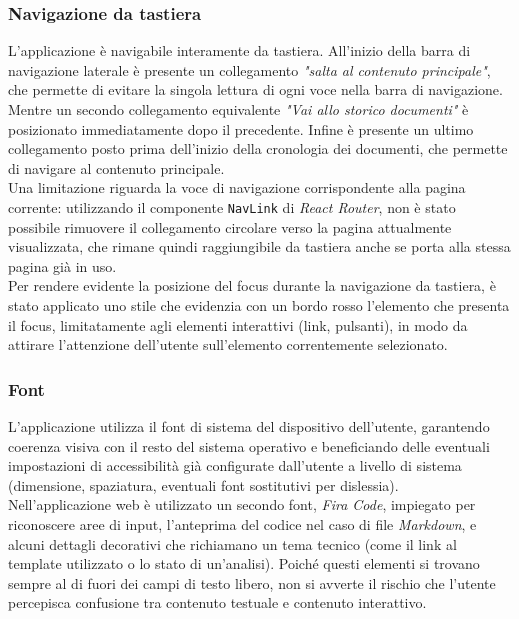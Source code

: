 \subsubsection{Navigazione da tastiera}
L'applicazione è navigabile interamente da tastiera. All'inizio della barra di navigazione laterale è presente un collegamento \emph{"salta al contenuto principale"}, che permette di evitare la singola lettura di ogni voce nella barra di navigazione. Mentre un secondo collegamento equivalente \emph{"Vai allo storico documenti"} è posizionato immediatamente dopo il precedente. Infine è presente un ultimo collegamento posto prima dell'inizio della cronologia dei documenti, che permette di navigare al contenuto principale.\\

Una limitazione riguarda la voce di navigazione corrispondente alla pagina corrente: utilizzando il componente \texttt{NavLink} di \emph{React Router}, non è stato possibile rimuovere il collegamento circolare verso la pagina attualmente visualizzata, che rimane quindi raggiungibile da tastiera anche se porta alla stessa pagina già in uso.\\

Per rendere evidente la posizione del focus durante la navigazione da tastiera, è stato applicato uno stile che evidenzia con un bordo rosso l'elemento che presenta il focus, limitatamente agli elementi interattivi (link, pulsanti), in modo da attirare l'attenzione dell'utente sull'elemento correntemente selezionato.

\subsubsection{Font}
L'applicazione utilizza il font di sistema del dispositivo dell'utente, garantendo coerenza visiva con il resto del sistema operativo e beneficiando delle eventuali impostazioni di accessibilità già configurate dall'utente a livello di sistema (dimensione, spaziatura, eventuali font sostitutivi per dislessia).\\

Nell'applicazione web è utilizzato un secondo font, \emph{Fira Code}, impiegato per riconoscere aree di input, l'anteprima del codice nel caso di file \emph{Markdown}, e alcuni dettagli decorativi che richiamano un tema tecnico (come il link al template utilizzato o lo stato di un'analisi). Poiché questi elementi si trovano sempre al di fuori dei campi di testo libero, non si avverte il rischio che l'utente percepisca confusione tra contenuto testuale e contenuto interattivo.\\

